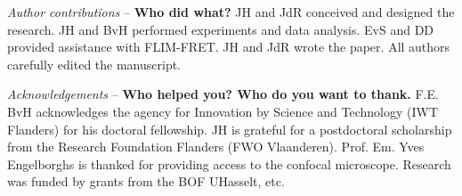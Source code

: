 \textit{Author contributions} -- \textbf{Who did what?} 
JH and JdR conceived and designed the research. 
JH and BvH performed experiments and data analysis. 
EvS and DD provided assistance with FLIM-FRET. JH and JdR wrote the paper. 
All authors carefully edited the manuscript.

\textit{Acknowledgements} -- \textbf{Who helped you? Who do you want to thank.} 
F.E. BvH acknowledges the agency for Innovation by Science and Technology (IWT Flanders) for his doctoral fellowship. 
JH is grateful for a postdoctoral scholarship from the Research Foundation Flanders (FWO Vlaanderen). 
Prof. Em. Yves Engelborghs is thanked for providing access to the confocal microscope. 
Research was funded by grants from the BOF UHasselt, etc.